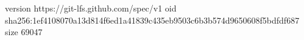 version https://git-lfs.github.com/spec/v1
oid sha256:1ef4108070a13d814f6ed1a41839c435eb9503c6b3b574d9650608f5bdfdf687
size 69047
